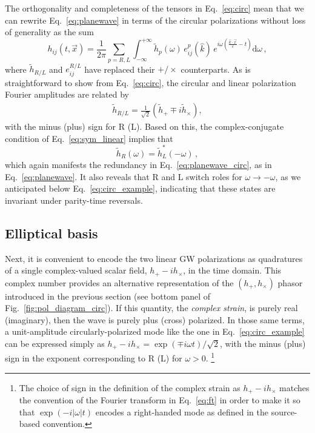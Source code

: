 \documentclass[aps,prd,twocolumn,superscriptaddress,preprintnumbers,floatfix,nofootinbib]{revtex4-2}
\newcommand{\beq}{\begin{equation}}
\newcommand{\eeq}{\end{equation}}
\newcommand*{\eq}[1]{Eq.~\eqref{eq:#1}}
\newcommand{\infd}{\mathrm{d}}
\begin{document}
The orthogonality and completeness of the tensors in Eq.~\eqref{eq:circ} mean that we can rewrite Eq.~\eqref{eq:planewave} in terms of the circular polarizations without loss of generality as the sum
\beq \label{eq:planewave_circ}
h_{ij}(t,\vec{x}) 
= \frac{1}{2\pi} \sum_{p=R,L} \int_{-\infty}^{+\infty} \tilde{h}_p(\omega)\, e^p_{ij}(\hat{k})\, e^{i\omega \left(\frac{\hat{k}\cdot\vec{x}}{c}-t\right)} \infd \omega \, ,
\eeq
where $\tilde{h}_{R/L}$ and $e^{R/L}_{ij}$ have replaced their $+/\times$ counterparts.
As is straightforward to show from Eq.~\eqref{eq:circ}, the circular and linear polarization Fourier amplitudes are related by
\begin{align} \label{eq:circ_amps}
\tilde{h}_{R/L} = \frac{1}{\sqrt{2}} \left(\tilde{h}_+ \mp i\tilde{h}_\times \right) ,
\end{align}
with the minus (plus) sign for R (L).
Based on this, the complex-conjugate condition of Eq.~\eqref{eq:sym_linear} implies that
\beq \label{eq:sym_circular}
\tilde{h}_R(\omega) = \tilde{h}_L^*(-\omega) \, ,
\eeq
which again manifests the redundancy in Eq.~\eqref{eq:planewave_circ}, as in Eq.~\eqref{eq:planewave}.
It also reveals that R and L switch roles for $\omega \to - \omega$, as we anticipated below Eq.~\eqref{eq:circ_example}, indicating that these states are invariant under parity-time reversals.


\subsection{Elliptical basis}
\label{sec:ellip}


Next, it is convenient to encode the two linear GW polarizations as quadratures of a single complex-valued scalar field, $h_+ - i h_\times$, in the time domain.
This complex number provides an alternative representation of the $\left(h_+, h_\times\right)$ phasor introduced in the previous section (see bottom panel of Fig.~\ref{fig:pol_diagram_circ}).
If this quantity, the \emph{complex strain}, is purely real (imaginary), then the wave is purely plus (cross) polarized.
In those same terms, a unit-amplitude circularly-polarized mode like the one in \eq{circ_example} can be expressed simply as $h_+ - i h_\times = \exp(\mp i \omega t)/\sqrt{2}$, with the minus (plus) sign in the exponent corresponding to R (L) for $\omega > 0$.%
\footnote{The choice of sign in the definition of the complex strain as $h_+ - ih_\times$ matches the convention of the Fourier transform in Eq.~\eqref{eq:ft} in order to make it so that $\exp(-i|\omega| t)$ encodes a right-handed mode as defined in the source-based convention.}
\end{document}

